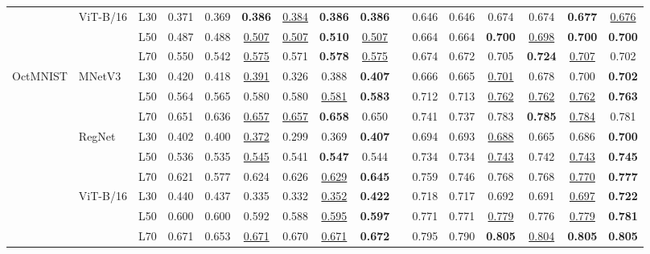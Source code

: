 \begin{table}[t]
\begin{tabular}{lll cccccc |c cccccc}
\cmidrule(lr){2-16}
 & \multirow{3}{*}{ViT-B/16} & L30 & 0.371 & 0.369 & \textbf{0.386} & \underline{0.384} & \textbf{0.386} & \textbf{0.386} & & 0.646 & 0.646 & 0.674 & 0.674 & \textbf{0.677} & \underline{0.676} \\
 &  & L50 & 0.487 & 0.488 & \underline{0.507} & \underline{0.507} & \textbf{0.510} & \underline{0.507} & & 0.664 & 0.664 & \textbf{0.700} & \underline{0.698} & \textbf{0.700} & \textbf{0.700} \\
 &  & L70 & 0.550 & 0.542 & \underline{0.575} & 0.571 & \textbf{0.578} & \underline{0.575} & & 0.674 & 0.672 & 0.705 & \textbf{0.724} & \underline{0.707} & 0.702 \\
\midrule
\multirow{9}{*}{OctMNIST} & \multirow{3}{*}{MNetV3} & L30 & 0.420 & 0.418 & \underline{0.391} & 0.326 & 0.388 & \textbf{0.407} & & 0.666 & 0.665 & \underline{0.701} & 0.678 & 0.700 & \textbf{0.702} \\
 &  & L50 & 0.564 & 0.565 & 0.580 & 0.580 & \underline{0.581} & \textbf{0.583} & & 0.712 & 0.713 & \underline{0.762} & \underline{0.762} & \underline{0.762} & \textbf{0.763} \\
 &  & L70 & 0.651 & 0.636 & \underline{0.657} & \underline{0.657} & \textbf{0.658} & 0.650 & & 0.741 & 0.737 & 0.783 & \textbf{0.785} & \underline{0.784} & 0.781 \\
\cmidrule(lr){2-16}
 & \multirow{3}{*}{RegNet} & L30 & 0.402 & 0.400 & \underline{0.372} & 0.299 & 0.369 & \textbf{0.407} & & 0.694 & 0.693 & \underline{0.688} & 0.665 & 0.686 & \textbf{0.700} \\
 &  & L50 & 0.536 & 0.535 & \underline{0.545} & 0.541 & \textbf{0.547} & 0.544 & & 0.734 & 0.734 & \underline{0.743} & 0.742 & \underline{0.743} & \textbf{0.745} \\
 &  & L70 & 0.621 & 0.577 & 0.624 & 0.626 & \underline{0.629} & \textbf{0.645} & & 0.759 & 0.746 & 0.768 & 0.768 & \underline{0.770} & \textbf{0.777} \\
\cmidrule(lr){2-16}
 & \multirow{3}{*}{ViT-B/16} & L30 & 0.440 & 0.437 & 0.335 & 0.332 & \underline{0.352} & \textbf{0.422} & & 0.718 & 0.717 & 0.692 & 0.691 & \underline{0.697} & \textbf{0.722} \\
 &  & L50 & 0.600 & 0.600 & 0.592 & 0.588 & \underline{0.595} & \textbf{0.597} & & 0.771 & 0.771 & \underline{0.779} & 0.776 & \underline{0.779} & \textbf{0.781} \\
 &  & L70 & 0.671 & 0.653 & \underline{0.671} & 0.670 & \underline{0.671} & \textbf{0.672} & & 0.795 & 0.790 & \textbf{0.805} & \underline{0.804} & \textbf{0.805} & \textbf{0.805} \\
\bottomrule
\end{tabular}
\end{table}
